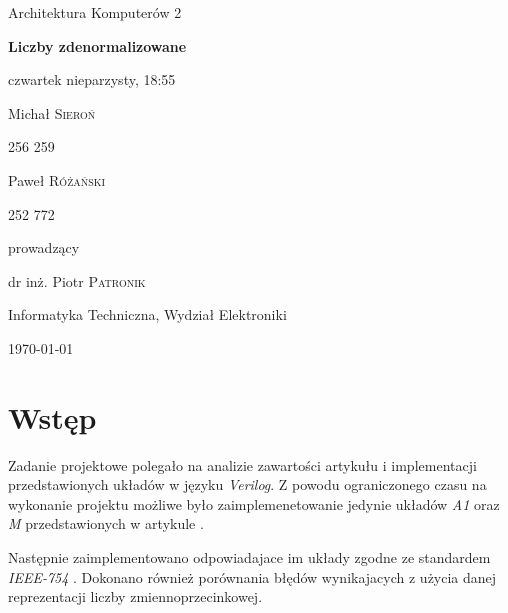 \documentclass{article}
\begin{document}
\begin{titlepage}
	\clearpage
	\thispagestyle{empty}
    \centering
    
	{\LARGE Architektura Komputerów 2 \par}
	
	\vspace{1.5cm}
	
	{\huge\bfseries Liczby zdenormalizowane\par}
	
	\vspace{1.5cm}
	{\large czwartek nieparzysty, 18:55\par}

	\vspace{1cm}
    \parbox{0.4\linewidth}{
	    \centering
	    {\Large Michał \textsc{Sieroń}\par}
	    {\large 256 259\par}
	}
    \hfill
    \parbox{0.4\linewidth}{
	    \centering
	    {\Large Paweł \textsc{Różański}\par}
	    {\large 252 772\par}
	}

	\vspace{1.5cm}
	{\large prowadzący\par}
	{\large dr inż. Piotr \textsc{Patronik}\par}
    
	\vfill

	{\large Informatyka Techniczna, Wydział Elektroniki\par}
	\vspace{0.5cm}
	{\large \today\par}
	\clearpage
\end{titlepage}

\tableofcontents
\newpage

\section{Wstęp}
Zadanie projektowe polegało na analizie zawartości artykułu i implementacji przedstawionych układów w języku \emph{Verilog}.
Z powodu ograniczonego czasu na wykonanie projektu możliwe było zaimplemenetowanie jedynie układów \emph{A1} oraz \emph{M} przedstawionych w artykule \cite{art:old}.

Następnie zaimplementowano odpowiadajace im układy zgodne ze standardem \emph{IEEE-754} \cite{art:ieee754}.
Dokonano również porównania błędów wynikajacych z użycia danej reprezentacji liczby zmiennoprzecinkowej. 
\end{document}
